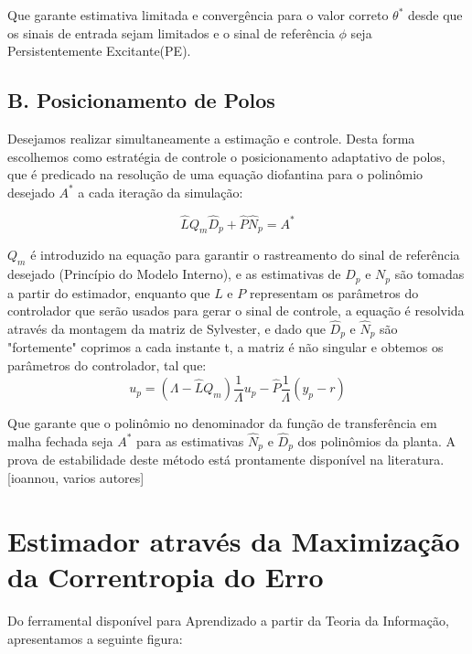 \documentclass[conference,harvard,brazil,english]{sbatex}
\begin{document}
Que garante estimativa limitada e convergência para o valor correto $\theta^*$ desde que os sinais de entrada sejam limitados e o sinal de referência $\phi$ seja Persistentemente Excitante(PE).

\subsection*{B. Posicionamento de Polos}

Desejamos realizar simultaneamente a estimação e controle. Desta forma escolhemos como estratégia de controle o posicionamento adaptativo de polos, que é predicado na resolução de uma equação diofantina para o polinômio desejado $A^*$ a cada iteração da simulação:

\begin{equation}
\hat{L} Q_m \hat{D}_p + \hat{P} \hat{N}_p = A^*
\end{equation}

$Q_m$ é introduzido na equação para garantir o rastreamento do sinal de referência desejado (Princípio do Modelo Interno), e as estimativas de $D_p$ e $N_p$ são tomadas a partir do estimador, enquanto que $L$ e $P$ representam os parâmetros do controlador que serão usados para gerar o sinal de controle, a equação é resolvida através da montagem da matriz de Sylvester, e dado que $\hat{D}_p$ e $\hat{N}_p$ são "fortemente" coprimos a cada instante t, a matriz é não singular e obtemos os parâmetros do controlador, tal que:\\

\begin{equation}
u_p = (\Lambda - \hat{L} Q_m)\frac{1}{\Lambda} u_p - \hat{P} \frac{1}{\Lambda}(y_p - r)
\end{equation}

Que garante que o polinômio no denominador da função de transferência em malha fechada seja $A^*$ para as estimativas $\hat{N}_p$ e $\hat{D}_p$ dos polinômios da planta. A prova de estabilidade deste método está prontamente disponível na literatura. [ioannou, varios autores] \\

\section{Estimador através da Maximização da Correntropia do Erro}

Do ferramental disponível para Aprendizado a partir da Teoria da Informação, apresentamos a seguinte figura:\\
\end{document}
